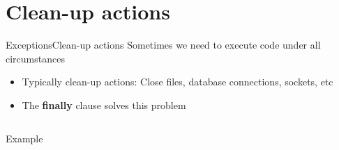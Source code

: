 \documentclass[10pt,compress]{beamer} %
\begin{document}
\section{Clean-up actions}
\begin{frame}{Exceptions}{Clean-up actions}
	\vspace{-0.2cm}
	Sometimes we need to execute code under all circumstances
	\begin{itemize}
		\item Typically clean-up actions: Close files, database connections, sockets, etc
		\item The \textbf{finally} clause solves this problem
	\end{itemize}

	\vspace{-0.2cm}
    \begin{columns}
	\begin{block}{Example}
	\vspace{-0.2cm}
		
	\vspace{-0.2cm}
	\end{block}

	\end{columns}
\end{frame}
\end{document}
